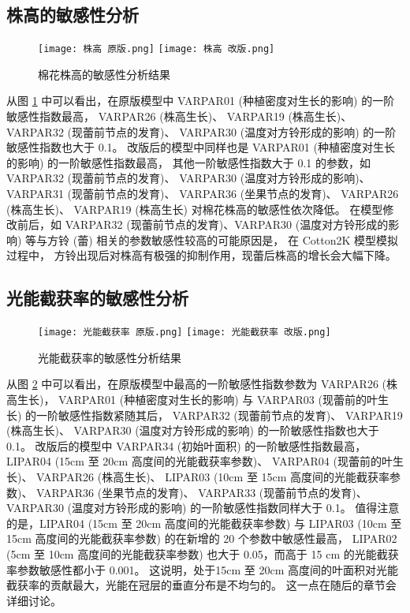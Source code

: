 \begin{spacing}{}
    \subsection{株高的敏感性分析}
    \begin{figure}
        \centering
        \texttt{[image: 株高 原版.png]}
        \texttt{[image: 株高 改版.png]}
        \caption{棉花株高的敏感性分析结果}\label{fig:saPlantHeight}
    \end{figure}

    从图 \ref{fig:saPlantHeight} 中可以看出，在原版模型中 VARPAR01 (种植密度对生长的影响) 的一阶敏感性指数最高，%
    VARPAR26 (株高生长)、%
    VARPAR19 (株高生长)、%
    VARPAR32 (现蕾前节点的发育)、%
    VARPAR30 (温度对方铃形成的影响) 的一阶敏感性指数也大于 0.1。%
    改版后的模型中同样也是 VARPAR01 (种植密度对生长的影响) 的一阶敏感性指数最高，%
    其他一阶敏感性指数大于 0.1 的参数，如 VARPAR32 (现蕾前节点的发育)、%
    VARPAR30 (温度对方铃形成的影响)、%
    VARPAR31 (现蕾前节点的发育)、%
    VARPAR36 (坐果节点的发育)、%
    VARPAR26 (株高生长)、%
    VARPAR19 (株高生长) 对棉花株高的敏感性依次降低。%
    在模型修改前后，如 VARPAR32 (现蕾前节点的发育)、VARPAR30 (温度对方铃形成的影响) 等与方铃 (蕾) 相关的参数敏感性较高的可能原因是，%
    在 Cotton2K 模型模拟过程中，%
    方铃出现后对株高有极强的抑制作用，现蕾后株高的增长会大幅下降。

    \subsection{光能截获率的敏感性分析}
    \begin{figure}
        \centering
        \texttt{[image: 光能截获率 原版.png]}
        \texttt{[image: 光能截获率 改版.png]}
        \caption{光能截获率的敏感性分析结果}\label{fig:saLightInterception}
    \end{figure}

    从图 \ref{fig:saLightInterception} 中可以看出，在原版模型中最高的一阶敏感性指数参数为 VARPAR26 (株高生长)，%
    VARPAR01 (种植密度对生长的影响) 与 VARPAR03 (现蕾前的叶生长) 的一阶敏感性指数紧随其后，
    VARPAR32 (现蕾前节点的发育)、%
    VARPAR19 (株高生长)、%
    VARPAR30 (温度对方铃形成的影响) 的一阶敏感性指数也大于 0.1。%
    改版后的模型中 VARPAR34 (初始叶面积) 的一阶敏感性指数最高，%
    LIPAR04 (15cm 至 20cm 高度间的光能截获率参数)、
    VARPAR04 (现蕾前的叶生长)、
    VARPAR26 (株高生长)、%
    LIPAR03 (10cm 至 15cm 高度间的光能截获率参数)、%
    VARPAR36 (坐果节点的发育)、%
    VARPAR33 (现蕾前节点的发育)、%
    VARPAR30 (温度对方铃形成的影响) 的一阶敏感性指数同样大于 0.1。
    值得注意的是，LIPAR04 (15cm 至 20cm 高度间的光能截获率参数) 与 LIPAR03 (10cm 至 15cm 高度间的光能截获率参数) 的在新增的 20 个参数中敏感性最高，%
    LIPAR02 (5cm 至 10cm 高度间的光能截获率参数) 也大于 0.05，而高于 15 cm 的光能截获率参数敏感性都小于 0.001。%
    这说明，处于15cm 至 20cm 高度间的叶面积对光能截获率的贡献最大，光能在冠层的垂直分布是不均匀的。%
    这一点在随后的章节会详细讨论。


\end{spacing}
